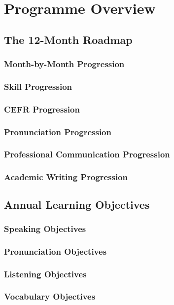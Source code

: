 \chapter{Programme Overview}

\section{The 12-Month Roadmap}
\subsection{Month-by-Month Progression}
\subsection{Skill Progression}
\subsection{CEFR Progression}
\subsection{Pronunciation Progression}
\subsection{Professional Communication Progression}
\subsection{Academic Writing Progression}

\section{Annual Learning Objectives}
\subsection{Speaking Objectives}
\subsection{Pronunciation Objectives}
\subsection{Listening Objectives}
\subsection{Vocabulary Objectives}
